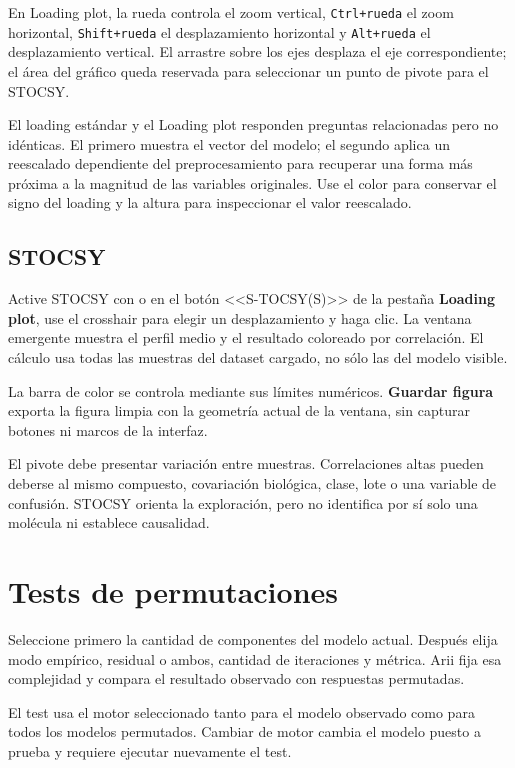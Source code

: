\documentclass[11pt,a4paper,openany]{report}
\newcommand{\menu}[1]{\textbf{#1}}
\newcommand{\code}[1]{\texttt{#1}}
\newcommand{\tecla}[1]{\fbox{\strut\textsf{#1}}}
\begin{document}
En Loading plot, la rueda controla el zoom vertical, \code{Ctrl+rueda} el zoom
horizontal, \code{Shift+rueda} el desplazamiento horizontal y
\code{Alt+rueda} el desplazamiento vertical. El arrastre sobre los ejes desplaza
el eje correspondiente; el área del gráfico queda reservada para seleccionar un
punto de pivote para el STOCSY.

El loading estándar y el Loading plot responden preguntas relacionadas pero no
idénticas. El primero muestra el vector del modelo; el segundo aplica un
reescalado dependiente del preprocesamiento para recuperar una forma más próxima
a la magnitud de las variables originales. Use el color para conservar el signo
del loading y la altura para inspeccionar el valor reescalado.

\section{STOCSY}

Active STOCSY con \tecla{S} o en el botón <<S-TOCSY(S)>> de la pestaña \menu{Loading plot}, use el crosshair para elegir un desplazamiento y haga clic. La ventana emergente muestra el perfil medio y el resultado coloreado por
correlación. El cálculo usa todas las muestras del dataset cargado, no sólo las
del modelo visible.

La barra de color se controla mediante sus límites numéricos. \menu{Guardar
figura} exporta la figura limpia con la geometría actual de la ventana, sin
capturar botones ni marcos de la interfaz.

El pivote debe presentar variación entre muestras. Correlaciones altas pueden
deberse al mismo compuesto, covariación biológica, clase, lote o una variable de
confusión. STOCSY orienta la exploración, pero no identifica por sí solo una
molécula ni establece causalidad.

\chapter{Tests de permutaciones}

Seleccione primero la cantidad de componentes del modelo actual. Después elija
modo empírico, residual o ambos, cantidad de iteraciones y métrica. Arii fija esa complejidad y compara el resultado observado con respuestas permutadas.

El test usa el motor seleccionado tanto para el modelo observado como para todos
los modelos permutados. Cambiar de motor cambia el modelo puesto a prueba y
requiere ejecutar nuevamente el test.
\end{document}
